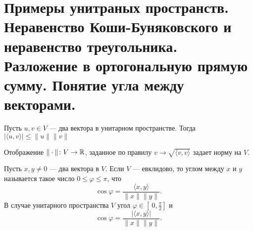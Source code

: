 \section{Примеры унитраных пространств. Неравенство Коши-Буняковского и неравенство треугольника. Разложение в ортогональную прямую сумму. Понятие угла между векторами.}
\begin{lm}
    Пусть $ u, v \in V$ --- два вектора в унитарном пространстве. Тогда $ \lvert \langle u, v \rangle \rvert \le \| u \| \| v \| $
\end{lm}
\begin{cor}
    Отображение $ \| \cdot  \| \colon V \to  \mathbb{R}$, заданное по правилу $ v \to  \sqrt{ \langle v, v \rangle} $ задает норму на $ V$.
\end{cor}
\begin{defn}
    Пусть $ x, y \ne 0$ --- два вектора в $ V$. Если  $ V$ --- евклидово, то {\sf углом между $ x$ и  $ y$} называется такое число $ 0 \le \varphi \le \pi$, что 
    \[
	\cos \varphi  = \frac{\langle x, y \rangle}{\| x \| \| y \| }
    .\] 
    В случае унитарного пространства $ V$ угол  $ \varphi \in [\:0, \frac{\pi}{2}]$ и 
    \[
	\cos \varphi  = \frac{\lvert \langle x, y \rangle \rvert }{\| x \| \| y \| }
    .\] 
\end{defn}
